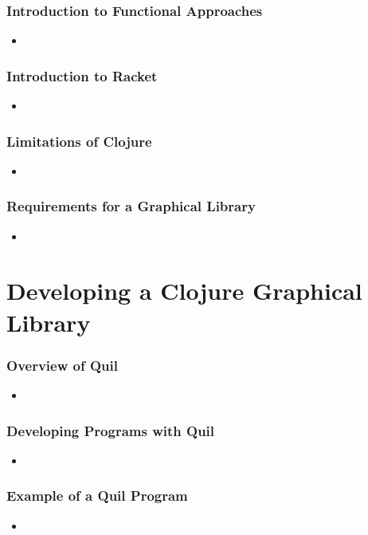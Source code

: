 \documentclass{beamer}
\begin{document}
\begin{frame}
\frametitle{Introduction to Functional Approaches}
\begin{itemize}
\item
\end{itemize}
\end{frame}

\begin{frame}
\frametitle{Introduction to Racket}
\begin{itemize}
\item
\end{itemize}
\end{frame}

\begin{frame}
\frametitle{Limitations of Clojure}
\begin{itemize}
\item
\end{itemize}
\end{frame}

\begin{frame}
\frametitle{Requirements for a Graphical Library}
\begin{itemize}
\item
\end{itemize}
\end{frame}

\section{Developing a Clojure Graphical Library}

\begin{frame}
\frametitle{Overview of Quil}
\begin{itemize}
\item
\end{itemize}
\end{frame}

\begin{frame}
\frametitle{Developing Programs with Quil}
\begin{itemize}
\item
\end{itemize}
\end{frame}

\begin{frame}
\frametitle{Example of a Quil Program}
\begin{itemize}
\item
\end{itemize}
\end{frame}
\end{document}
